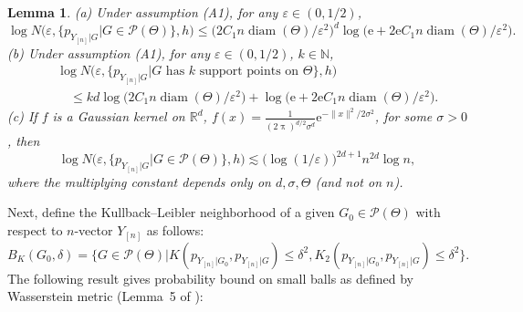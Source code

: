 \documentclass[MSNbibl,number,citesort]{arxbj}
\def\pi{\uppi}
\def\comment{}
\newtheorem{lemma}{Lemma}[section]
\newcommand{\Nat}{\mathbb{N}}
\newcommand{\real}{\mathbb{R}}
\newcommand{\Pcal}{\mathscr{P}}
\newcommand{\YYn}{Y_{[n]}}
\begin{document}
%
\begin{lemma}
\label{Lem-entropy}
\textup{(a)} Under assumption \textup{(A1)}, for any $\varepsilon\in(0,1/2)$,
%
\[
\log N \bigl(\varepsilon, \bigl\{{p_{Y_{[n]}|G}}| G \in \Pcal(
\Theta) \bigr\}, h \bigr) \leq \bigl(2C_1 n \operatorname{diam}(
\Theta)/\varepsilon^2 \bigr)^{d} \log \bigl( \mathrm{e}+
2\mathrm{e}C_1 n \operatorname{diam}(\Theta)/\varepsilon^2 \bigr).
\]
%
\textup{(b)} Under assumption \textup{(A1)}, for any $\varepsilon\in(0,1/2)$, $k \in
\Nat$,
%
\begin{eqnarray*}
&&\log N \bigl(\varepsilon, \{{p_{Y_{[n]}|G}}| G \mbox { has } k
\mbox{ support points on } \Theta\}, h \bigr)
\\
&&\quad\leq kd\log \bigl(2C_1 n \operatorname{diam}(\Theta)/
\varepsilon^2 \bigr) + \log \bigl(\mathrm{e}+ 2\mathrm{e}C_1 n
\operatorname{diam}(\Theta)/ \varepsilon^2 \bigr).
\end{eqnarray*}
%
\textup{(c)} If $f$ is a Gaussian kernel on $\real^d$,
$f(x) = \frac{1}{(2\pi)^{d/2}\sigma^{d}}
\mathrm{e}^{-\|x\|^2/2\sigma^2}$, for some $\sigma>0$, then
%
\[
\log N \bigl(\varepsilon, \bigl\{{p_{Y_{[n]}|G}}| G \in \Pcal(
\Theta) \bigr\}, h \bigr) \lesssim \bigl(\log(1/\varepsilon) \bigr)^{2d+1}n^{2d}
\log n,
\]
%
where the multiplying constant depends only on $d, \sigma, \Theta$
(and not on $n$).
\end{lemma}


Next, define the Kullback--Leibler neighborhood of a given $G_0 \in
\Pcal(\Theta)$
with respect to $n$-vector $\YYn$ as follows:
%
%
\begin{equation}
\label{Eqn-def-KL} B_K(G_0,\delta) = \bigl\{G \in\Pcal(
\Theta)| K(p_{\YYn|G_0},p_{\YYn|G}) \leq\delta^2,
K_2(p_{\YYn|G_0},p_{\YYn|G}) \leq\delta^2
\bigr\}.
\end{equation}
%
%
The following result gives probability bound on small balls as defined by
Wasserstein metric (Lemma~5 of \cite{Nguyen-11}):
\end{document}
